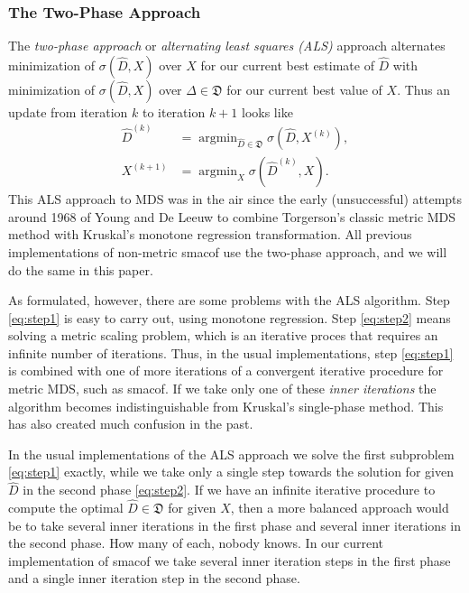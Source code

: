 \documentclass[
  12pt,
]{article}
\begin{document}
\subsubsection{The Two-Phase Approach}\label{the-two-phase-approach}

The \emph{two-phase approach} or \emph{alternating least squares (ALS)} approach
alternates minimization of \(\sigma(\hat D,X)\) over \(X\) for our current
best estimate of \(\hat D\) with minimization of \(\sigma(\hat D,X)\) over
\(\Delta\in\mathfrak{D}\) for our current best value of \(X\). Thus an
update from iteration \(k\) to iteration \(k+1\) looks like \begin{align}
\hat D^{(k)}&=\mathop{\text{argmin}}_{\hat D\in\mathfrak{D}}\sigma(\hat D,X^{(k)}),\label{eq:step1}\\
X^{(k+1)}&=\mathop{\text{argmin}}_X\sigma(\hat D^{(k)},X).\label{eq:step2}
\end{align} This ALS approach to MDS was in the air since the early
(unsuccessful) attempts around 1968 of Young and De Leeuw to combine
Torgerson's classic metric MDS method with Kruskal's monotone regression
transformation. All previous implementations of non-metric smacof use
the two-phase approach, and we will do the same in this paper.

As formulated, however, there are some problems with the ALS algorithm.
Step \eqref{eq:step1} is easy to carry out, using monotone regression.
Step \eqref{eq:step2} means solving a metric scaling problem, which is an
iterative proces that requires an infinite number of iterations. Thus,
in the usual implementations, step \eqref{eq:step1} is combined with one
of more iterations of a convergent iterative procedure for metric MDS,
such as smacof. If we take only one of these \emph{inner iterations} the
algorithm becomes indistinguishable from Kruskal's single-phase method.
This has also created much confusion in the past.

In the usual implementations of the ALS approach we solve the first
subproblem \eqref{eq:step1} exactly, while we take only a single step
towards the solution for given \(\hat D\) in the second phase
\eqref{eq:step2}. If we have an infinite iterative procedure to compute
the optimal \(\hat D\in\mathfrak{D}\) for given \(X\), then a more balanced
approach would be to take several inner iterations in the first phase
and several inner iterations in the second phase. How many of each,
nobody knows. In our current implementation of smacof we take several
inner iteration steps in the first phase and a single inner iteration
step in the second phase.
\end{document}
